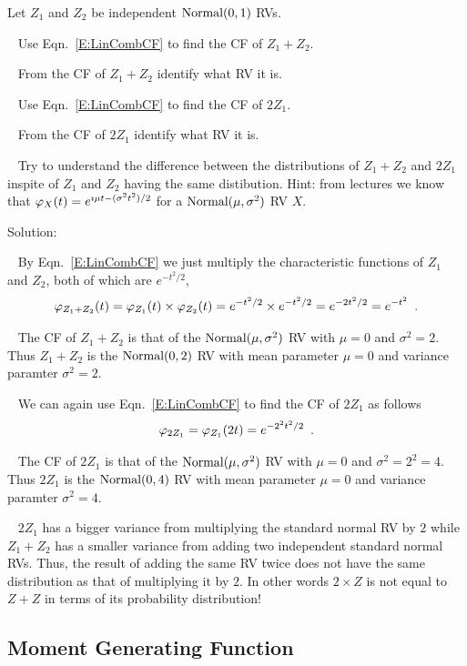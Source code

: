 \begin{example}\label{EgCFOfSumOf2IndepNormals}
Let $Z_1$ and $Z_2$ be independent $\mbox{{\rm Normal}}(0,1)$ RVs.  
\be
\item~
Use Eqn.~\eqref{E:LinCombCF} 
to find the CF of $Z_1+Z_2$.  
\item~
From the CF of $Z_1+Z_2$ identify what RV it is.
\item~
Use Eqn.~\eqref{E:LinCombCF} 
to find the CF of $2Z_1$.
\item~
From the CF of $2Z_1$ identify what RV it is.
\item~
Try to understand the difference between the distributions of $Z_1+Z_2$ and $2 Z_1$ inspite of $Z_1$ and $Z_2$ having the same distibution.
\ee
{Hint: from lectures we know that $\varphi_X(t) = e^{\imath \mu t - (\sigma^2 t^2)/2}$ for a $\mbox{{\rm Normal}}(\mu,\sigma^2)$ RV $X$.}

Solution:

\be
\item~
By Eqn.~\eqref{E:LinCombCF} 
we just multiply the characteristic functions of $Z_1$ and $Z_2$, both of which are $e^{-t^2/2}$,
\[
\varphi_{Z_1+Z_2}(t)= \varphi_{Z_1}(t) \times \varphi_{Z_2}(t) = e^{-t^2/2} \times e^{-t^2/2} = e^{-2t^2/2} = e^{-t^2} \enspace . 
\]  
\item~
The CF of $Z_1+Z_2$ is that of the $\mbox{{\rm Normal}}(\mu,\sigma^2)$ RV with $\mu=0$ and $\sigma^2=2$.  
Thus $Z_1+Z_2$ is the $\mbox{{\rm Normal}}(0,2)$ RV with mean parameter $\mu=0$ and variance paramter $\sigma^2=2$.
\item~
We can again use Eqn.~\eqref{E:LinCombCF} 
to find the CF of $2Z_1$ as follows
\[
\varphi_{2Z_1} = \varphi_{Z_1}(2 t) = e^{-2^2t^2/2} \enspace .
\]
\item~
The CF of $2Z_1$ is that of the $\mbox{{\rm Normal}}(\mu,\sigma^2)$ RV with $\mu=0$ and $\sigma^2=2^2=4$.
Thus $2Z_1$ is the $\mbox{{\rm Normal}}(0,4)$ RV with mean parameter $\mu=0$ and variance paramter $\sigma^2=4$.
\item~
$2Z_1$ has a bigger variance from multiplying the standard normal RV by $2$ while $Z_1+Z_2$ has a smaller variance from adding two independent standard normal RVs.  Thus, the result of adding the same RV twice does not have the same distribution as that of multiplying it by $2$.  In other words $2 \times Z$ is not equal to $Z+Z$ in terms of its probability distribution! 
\ee
\end{example}


\subsection{Moment Generating Function}


